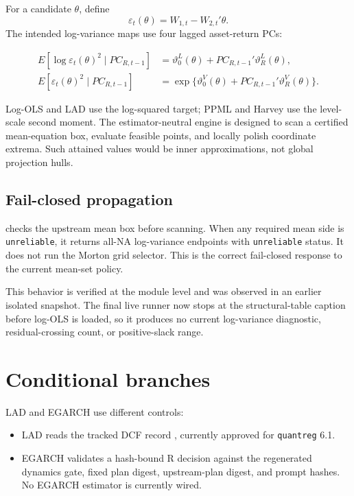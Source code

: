 \documentclass[11pt]{article}
\begin{document}
For a candidate $\theta$, define
\[
  \varepsilon_t(\theta)=W_{1,t}-W_{2,t}'\theta.
\]
The intended log-variance maps use four lagged asset-return PCs:

\begin{align*}
 E[\log\varepsilon_t(\theta)^2\mid PC_{R,t-1}]
   &=\vartheta_0^L(\theta)+PC_{R,t-1}'\vartheta_R^L(\theta),\\
 E[\varepsilon_t(\theta)^2\mid PC_{R,t-1}]
   &=\exp\{\vartheta_0^V(\theta)+PC_{R,t-1}'\vartheta_R^V(\theta)\}.
\end{align*}

Log-OLS and LAD use the log-squared target; PPML and Harvey use the
level-scale second moment. The estimator-neutral engine is designed to scan a
certified mean-equation box, evaluate feasible points, and locally polish
coordinate extrema. Such attained values would be inner approximations, not
global projection hulls.

\subsection{Fail-closed propagation}

 checks the upstream mean box before scanning.
When any required mean side is \texttt{unreliable}, it returns all-NA
log-variance endpoints with \texttt{unreliable} status. It does not run the
Morton grid selector. This is the correct fail-closed response to the current
mean-set policy.

This behavior is verified at the module level and was observed in an earlier
isolated snapshot. The final live runner now stops at the structural-table
caption before log-OLS is loaded, so it produces no current log-variance
diagnostic, residual-crossing count, or positive-slack range.

\section{Conditional branches}

LAD and EGARCH use different controls:

\begin{sloppypar}
\begin{itemize}[leftmargin=1.5em]
  \item LAD reads the tracked DCF record
    , currently approved for
    \texttt{quantreg} 6.1.
  \item EGARCH validates a hash-bound R decision against the regenerated
    dynamics gate, fixed plan digest, upstream-plan digest, and prompt hashes.
    No EGARCH estimator is currently wired.
\end{itemize}
\end{sloppypar}
\end{document}
